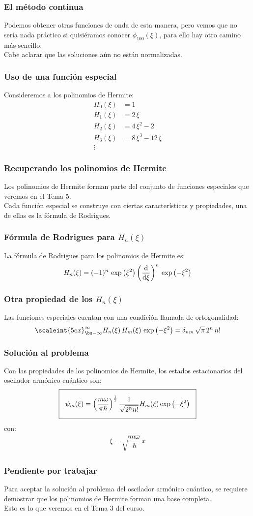 \documentclass[12pt]{beamer}
\begin{document}
\begin{frame}
\frametitle{El método continua}
Podemos obtener otras funciones de onda de esta manera, \pause pero vemos que no sería nada práctico si quisiéramos conocer $\phi_{100}(\xi)$, para ello hay otro camino más sencillo.
\\
\bigskip
\pause
Cabe aclarar que las soluciones aún no están normalizadas.
\end{frame}
\begin{frame}
\frametitle{Uso de una función especial}
Consideremos a los polinomios de Hermite:
\pause
\begin{align*}
H_{0}(\xi) &= 1 \\[0.5em]
H_{1}(\xi) &= 2 \, \xi \\[0.5em]
H_{2}(\xi) &= 4 \, \xi^{2} - 2 \\[0.5em]
H_{3}(\xi) &= 8 \, \xi^{3} - 12 \, \xi \\[0.5em]
\vdots
\end{align*}
\end{frame}
\begin{frame}
\frametitle{Recuperando los polinomios de Hermite}
Los polinomios de Hermite forman parte del conjunto de funciones especiales que veremos en el Tema 5.
\\
\bigskip
\pause
Cada función especial se construye con ciertas características y propiedades, una de ellas es la fórmula de Rodrigues.
\end{frame}
\begin{frame}
\frametitle{Fórmula de Rodrigues para $H_{n}(\xi)$}
La fórmula de Rodrigues para los polinomios de Hermite es:
\begin{align*}
H_{n} (\xi) = (-1)^{n} \, \exp \left( \xi^{2} \right) \left( \dv{\xi} \right)^{n} \, \exp \left( - \xi^{2} \right)
\end{align*}
\end{frame}
\begin{frame}[opciones]
\frametitle{Otra propiedad de los $H_{n}(\xi)$}
Las funciones especiales cuentan con una condición llamada de ortogonalidad:
\begin{align*}
\scaleint{5ex}_{\bs - \infty}^{\infty} H_{n}(\xi) \, H_{m}(\xi) \, \exp \left( - \xi^{2} \right) = \delta_{nm} \, \sqrt{\pi} \, 2^{n} \, n!
\end{align*}
\end{frame}
\begin{frame}
\frametitle{Solución al problema}
Con las propiedades de los polinomios de Hermite, los estados estacionarios del oscilador armónico cuántico son:
\begin{align*}
\setlength{\fboxsep}{3\fboxsep}\boxed{
\psi_{m}(\xi) = \left( \dfrac{m \omega}{\pi \hbar} \right)^{\frac{1}{2}} \dfrac{1}{\sqrt{2^{n} n!}} H_{m}(\xi) \exp \left( - \xi^{2} \right) }
\end{align*}
con:
\begin{align*}
\xi = \sqrt{\dfrac{m \omega}{\hbar}} \, x
\end{align*}
\end{frame}
\begin{frame}
\frametitle{Pendiente por trabajar}
Para aceptar la solución al problema del oscilador armónico cuántico, se requiere demostrar que los polinomios de Hermite forman una base completa.
\\
\bigskip
Esto es lo que veremos en el Tema 3 del curso.
\end{frame}
\end{document}
